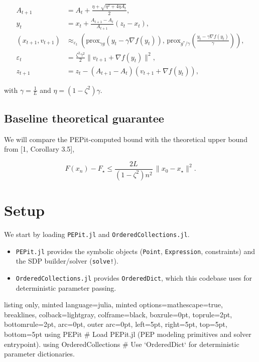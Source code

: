 \documentclass{article}
\begin{document}
\begin{equation}\label{aifb-iter}
\begin{aligned}
A_{t+1} &= A_t + \frac{\eta+\sqrt{\eta^2+4\eta A_t}}{2}, \\
y_t &= x_t + \frac{A_{t+1}-A_t}{A_{t+1}}(z_t-x_t), \\
(x_{t+1},v_{t+1}) &\approx_{\varepsilon_t} \left(\mathrm{prox}_{\gamma g}\!\left(y_t-\gamma \nabla f(y_t)\right),\,
\mathrm{prox}_{g^*/\gamma}\!\left(\frac{y_t-\gamma \nabla f(y_t)}{\gamma}\right)\right), \\
\varepsilon_t &= \frac{\zeta^2\gamma^2}{2}\|v_{t+1}+\nabla f(y_t)\|^2, \\
z_{t+1} &= z_t-(A_{t+1}-A_t)\left(v_{t+1}+\nabla f(y_t)\right),
\end{aligned}
\end{equation}

with $\gamma=\tfrac{1}{L}$ and $\eta=(1-\zeta^2)\gamma$.

\subsection{Baseline theoretical guarantee}

We will compare the PEPit-computed bound with the theoretical upper bound from [1, Corollary 3.5],

\begin{equation}\label{aifb-theory}
F(x_n)-F_\star \le \frac{2L}{(1-\zeta^2)n^2}\,\|x_0-x_\star\|^2.
\end{equation}
\section{Setup}

We start by loading \texttt{PEPit.jl} and \texttt{OrderedCollections.jl}.

\begin{itemize}
\item \texttt{PEPit.jl} provides the symbolic objects (\texttt{Point}, \texttt{Expression}, constraints) and the SDP builder/solver (\texttt{solve!}).
\item \texttt{OrderedCollections.jl} provides \texttt{OrderedDict}, which this codebase uses for deterministic parameter passing.
\end{itemize}

\begin{tcblisting}{listing only, minted language=julia, minted options={mathescape=true, breaklines}, colback=lightgray, colframe=black, boxrule=0pt, toprule=2pt, bottomrule=2pt, arc=0pt, outer arc=0pt, left=5pt, right=5pt, top=5pt, bottom=5pt}
using PEPit # Load PEPit.jl (PEP modeling primitives and solver entrypoint).
using OrderedCollections # Use `OrderedDict` for deterministic parameter dictionaries.
\end{tcblisting}
\end{document}
